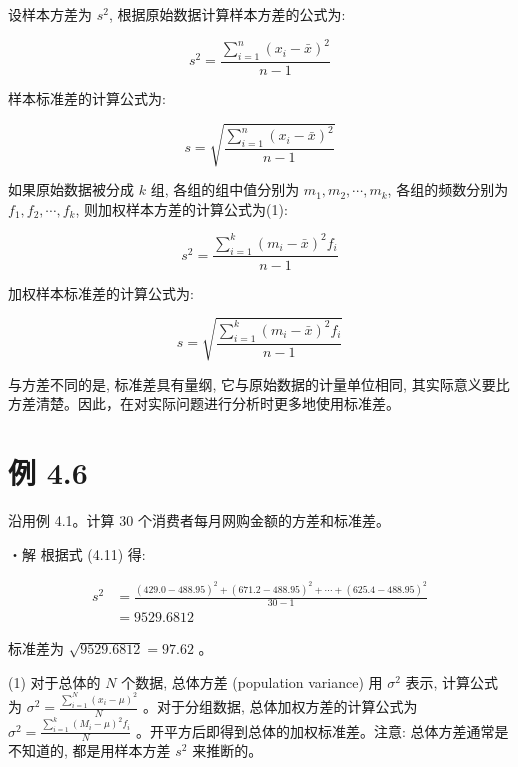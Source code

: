 \documentclass[10pt]{article}
\begin{document}
\begin{CJK*}{UTF8}{bsmi}
设样本方差为 $s^{2}$, 根据原始数据计算样本方差的公式为:


\begin{equation*}
s^{2}=\frac{\sum_{i=1}^{n}\left(x_{i}-\bar{x}\right)^{2}}{n-1} \tag{4.11}
\end{equation*}


样本标准差的计算公式为:


\begin{equation*}
s=\sqrt{\frac{\sum_{i=1}^{n}\left(x_{i}-\bar{x}\right)^{2}}{n-1}} \tag{4.12}
\end{equation*}


如果原始数据被分成 $k$ 组, 各组的组中值分别为 $m_{1}, m_{2}, \cdots, m_{k}$, 各组的频数分别为 $f_{1}, f_{2}, \cdots, f_{k}$, 则加权样本方差的计算公式为(1):


\begin{equation*}
s^{2}=\frac{\sum_{i=1}^{k}\left(m_{i}-\bar{x}\right)^{2} f_{i}}{n-1} \tag{4.13}
\end{equation*}


加权样本标准差的计算公式为:


\begin{equation*}
s=\sqrt{\frac{\sum_{i=1}^{k}\left(m_{i}-\bar{x}\right)^{2} f_{i}}{n-1}} \tag{4.14}
\end{equation*}


与方差不同的是, 标准差具有量纲, 它与原始数据的计量单位相同, 其实际意义要比方差清楚。因此，在对实际问题进行分析时更多地使用标准差。

\section*{例 4.6}
沿用例 4.1。计算 30 个消费者每月网购金额的方差和标准差。

・解 根据式 (4.11) 得:

$$
\begin{aligned}
s^{2} & =\frac{(429.0-488.95)^{2}+(671.2-488.95)^{2}+\cdots+(625.4-488.95)^{2}}{30-1} \\
& =9529.6812
\end{aligned}
$$

标准差为 $\sqrt{9529.6812}=97.62$ 。

(1) 对于总体的 $N$ 个数据, 总体方差 (population variance) 用 $\sigma^{2}$ 表示, 计算公式为 $\sigma^{2}=\frac{\sum_{i=1}^{N}\left(x_{i}-\mu\right)^{2}}{N}$ 。对于分组数据, 总体加权方差的计算公式为 $\sigma^{2}=\frac{\sum_{i=1}^{k}\left(M_{i}-\mu\right)^{2} f_{i}}{N}$ 。开平方后即得到总体的加权标准差。注意: 总体方差通常是不知道的, 都是用样本方差 $s^{2}$ 来推断的。


\end{CJK*}
\end{document}
